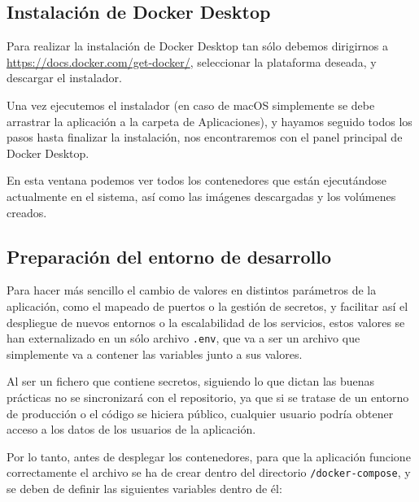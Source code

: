 \subsection{Instalación de Docker Desktop}


Para realizar la instalación de Docker Desktop tan sólo debemos dirigirnos a \url{https://docs.docker.com/get-docker/}, seleccionar la plataforma deseada, y descargar el instalador.


Una vez ejecutemos el instalador (en caso de macOS simplemente se debe arrastrar la aplicación a la carpeta de Aplicaciones), y hayamos seguido todos los pasos hasta finalizar la instalación, nos encontraremos con el panel principal de Docker Desktop. 


En esta ventana podemos ver todos los contenedores que están ejecutándose actualmente en el sistema, así como las imágenes descargadas y los volúmenes creados.

\subsection{Preparación del entorno de desarrollo} \label{entorno-desarrollo}

Para hacer más sencillo el cambio de valores en distintos parámetros de la aplicación, como el mapeado de puertos o la gestión de secretos, y facilitar así el despliegue de nuevos entornos o la escalabilidad de los servicios, estos valores se han externalizado en un sólo archivo \verb,.env,, que va a ser un archivo que simplemente va a contener las variables junto a sus valores. 

Al ser un fichero que contiene secretos, siguiendo lo que dictan las buenas prácticas no se sincronizará con el repositorio, ya que si se tratase de un entorno de producción o el código se hiciera público, cualquier usuario podría obtener acceso a los datos de los usuarios de la aplicación.

Por lo tanto, antes de desplegar los contenedores, para que la aplicación funcione correctamente el archivo se ha de crear dentro del directorio \verb,/docker-compose,, y se deben de definir las siguientes variables dentro de él:

